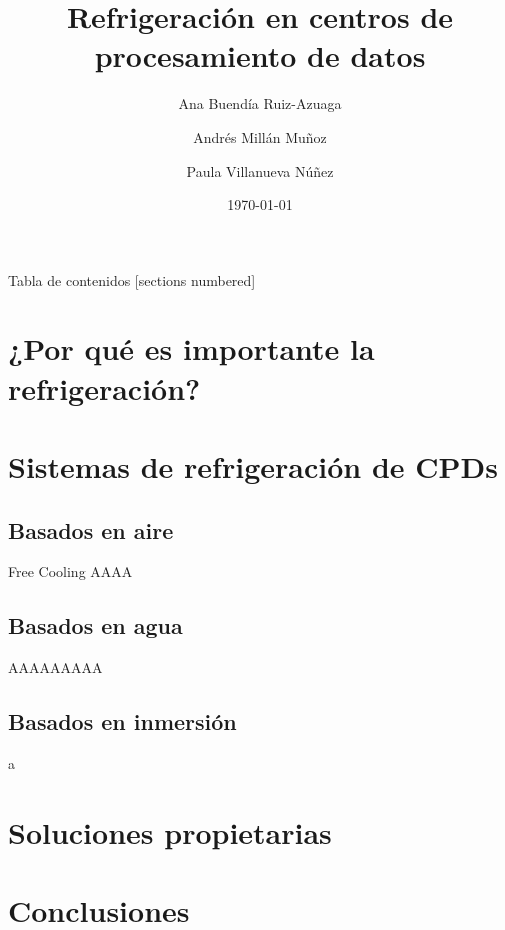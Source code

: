 \documentclass[aspectratio=169, compress]{beamer}
\title{Refrigeración en centros de procesamiento de datos}
\date{\today}
\author{Ana Buendía Ruiz-Azuaga \and Andrés Millán Muñoz \and Paula Villanueva Núñez}
\institute{Universidad de Granada}
\begin{document}
\maketitle

\begin{frame}{Tabla de contenidos}
    [sections numbered]
    \tableofcontents
\end{frame}

\section{¿Por qué es importante la refrigeración?}    %

\section{Sistemas de refrigeración de CPDs}

\subsection{Basados en aire}

\begin{frame}{Free Cooling}
    AAAA
\end{frame}

\subsection{Basados en agua}

\begin{frame}
    AAAAAAAAA
\end{frame}


\subsection{Basados en inmersión}

\begin{frame}
    a
\end{frame}


\section{Soluciones propietarias}

\section{Conclusiones}
\end{document}
